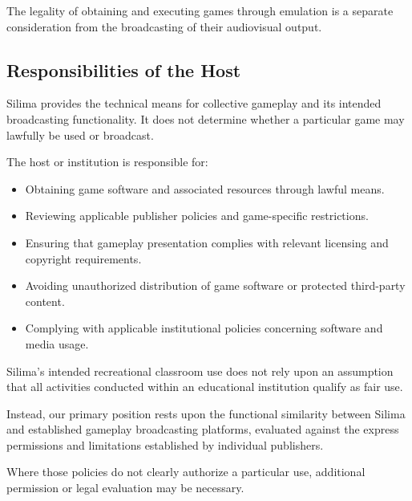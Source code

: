 The legality of obtaining and executing games through
emulation is a separate consideration from the
broadcasting of their audiovisual output.

\subsection{Responsibilities of the Host}

Silima provides the technical means for collective
gameplay and its intended broadcasting functionality.
It does not determine whether a particular game may
lawfully be used or broadcast.

The host or institution is responsible for:

\begin{itemize}
    \item Obtaining game software and associated
    resources through lawful means.

    \item Reviewing applicable publisher policies
    and game-specific restrictions.

    \item Ensuring that gameplay presentation complies
    with relevant licensing and copyright requirements.

    \item Avoiding unauthorized distribution of game
    software or protected third-party content.

    \item Complying with applicable institutional
    policies concerning software and media usage.
\end{itemize}

Silima's intended recreational classroom use does not
rely upon an assumption that all activities conducted
within an educational institution qualify as fair use.

Instead, our primary position rests upon the functional
similarity between Silima and established gameplay
broadcasting platforms, evaluated against the express
permissions and limitations established by individual
publishers.

Where those policies do not clearly authorize a
particular use, additional permission or legal
evaluation may be necessary.
